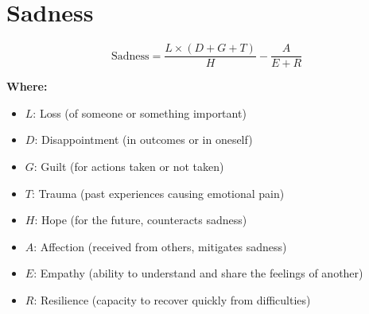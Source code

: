 \chapter{Sadness}

\begin{equation}
\text{Sadness} = \frac{L \times (D + G + T)}{H} - \frac{A}{E+R}
\end{equation}

\textbf{Where:}

\begin{itemize}
    \item $L$: Loss (of someone or something important)
    \item $D$: Disappointment (in outcomes or in oneself)
    \item $G$: Guilt (for actions taken or not taken)
    \item $T$: Trauma (past experiences causing emotional pain)
    \item $H$: Hope (for the future, counteracts sadness)
    \item $A$: Affection (received from others, mitigates sadness)
    \item $E$: Empathy (ability to understand and share the feelings of another)
    \item $R$: Resilience (capacity to recover quickly from difficulties)
\end{itemize}